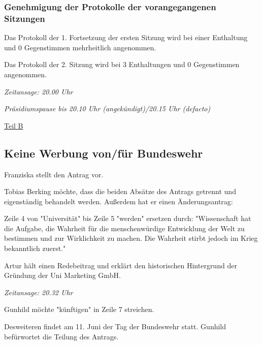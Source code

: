 \documentclass[ngerman,headheight=70pt]{scrartcl}
\begin{document}
    \subsubsection{Genehmigung der Protokolle der vorangegangenen Sitzungen}

    Das Protokoll der 1. Fortsetzung der ersten Sitzung wird bei einer Enthaltung
    und 0 Gegenstimmen mehrheitlich angenommen.

    Das Protokoll der 2. Sitzung  wird bei 3 Enthaltungen und 0 Gegenstimmen
    angenommen.

    \textit{Zeitansage: 20.00 Uhr}

    \textit{Präsidiumspause bis 20.10 Uhr (angekündigt)/20.15 Uhr (defacto)}

    \newpage
    {\Large \underline{Teil B}}


    \subsection{Keine Werbung von/für Bundeswehr}

    Franziska stellt den Antrag vor.

    Tobias Berking möchte, dass die beiden Absätze des Antrags getrennt
    und eigenständig behandelt werden. Außerdem hat er einen Änderungsantrag:

    Zeile 4 von "Universität" bis Zeile 5 "werden" ersetzen durch:
    "Wissenschaft hat die Aufgabe, die Wahrheit für die menschenwürdige
    Entwicklung der Welt zu bestimmen und zur Wirklichkeit zu machen. Die
    Wahrheit stirbt jedoch im Krieg bekanntlich zuerst."

    Artur hält einen Redebeitrag und erklärt den historischen Hintergrund
    der Gründung der Uni Marketing GmbH.

    \textit{Zeitansage: 20.32 Uhr}

    Gunhild möchte "künftigen" in Zeile 7 streichen.

    Desweiteren findet am 11. Juni der Tag der Bundeswehr statt. Gunhild
    befürwortet die Teilung des Antrags.
\end{document}
